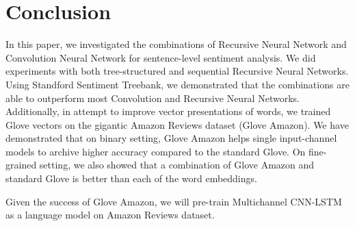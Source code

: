 \section{Conclusion}
In this paper, we investigated the combinations of Recursive Neural Network and Convolution Neural Network for sentence-level sentiment analysis. 
We did experiments with both tree-structured and sequential Recursive Neural Networks.
Using Standford Sentiment Treebank, we demonstrated that the combinations are able to outperform most Convolution and Recursive Neural Networks.
Additionally, in attempt to improve vector presentations of words, we trained Glove vectors on the gigantic Amazon Reviews dataset (Glove Amazon).
We have demonstrated that on binary setting, Glove Amazon helps single input-channel models to archive higher accuracy compared to the standard Glove.   
On fine-grained setting, we also showed that a combination of Glove Amazon and standard Glove is better than each of the word embeddings.

Given the success of Glove Amazon, we will pre-train Multichannel CNN-LSTM as a language model on Amazon Reviews dataset.

